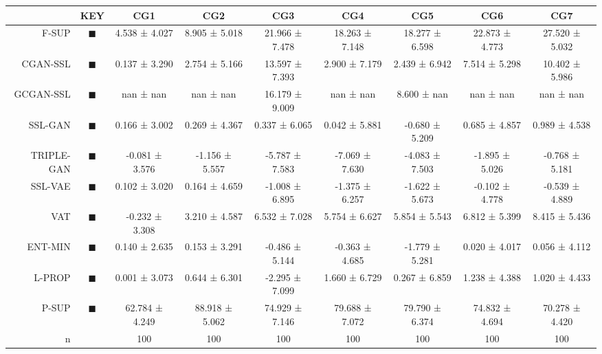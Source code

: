 \begin{tabular}{rcccccccc}
\toprule
 & KEY & CG1 & CG2 & CG3 & CG4 & CG5 & CG6 & CG7 \\
\midrule
F-SUP & \textcolor{FULLY_SUPERVISED_CLASSIFIER}{\LARGE $\blacksquare$} & 4.538 ± 4.027 & 8.905 ± 5.018 & 21.966 ± 7.478 & 18.263 ± 7.148 & 18.277 ± 6.598 & 22.873 ± 4.773 & 27.520 ± 5.032 \\
CGAN-SSL & \textcolor{CGAN_BASIC_DJ_SUPERVISED_CLASSIFIER}{\LARGE $\blacksquare$} & 0.137 ± 3.290 & 2.754 ± 5.166 & 13.597 ± 7.393 & 2.900 ± 7.179 & 2.439 ± 6.942 & 7.514 ± 5.298 & 10.402 ± 5.986 \\
GCGAN-SSL & \textcolor{CGAN_GUMBEL_DJ_SUPERVISED_CLASSIFIER}{\LARGE $\blacksquare$} & nan ± nan & nan ± nan & 16.179 ± 9.009 & nan ± nan & 8.600 ± nan & nan ± nan & nan ± nan \\
SSL-GAN & \textcolor{SSL_GAN}{\LARGE $\blacksquare$} & 0.166 ± 3.002 & 0.269 ± 4.367 & 0.337 ± 6.065 & 0.042 ± 5.881 & -0.680 ± 5.209 & 0.685 ± 4.857 & 0.989 ± 4.538 \\
TRIPLE-GAN & \textcolor{TRIPLE_GAN}{\LARGE $\blacksquare$} & -0.081 ± 3.576 & -1.156 ± 5.557 & -5.787 ± 7.583 & -7.069 ± 7.630 & -4.083 ± 7.503 & -1.895 ± 5.026 & -0.768 ± 5.181 \\
SSL-VAE & \textcolor{SSL_VAE}{\LARGE $\blacksquare$} & 0.102 ± 3.020 & 0.164 ± 4.659 & -1.008 ± 6.895 & -1.375 ± 6.257 & -1.622 ± 5.673 & -0.102 ± 4.778 & -0.539 ± 4.889 \\
VAT & \textcolor{VAT}{\LARGE $\blacksquare$} & -0.232 ± 3.308 & 3.210 ± 4.587 & 6.532 ± 7.028 & 5.754 ± 6.627 & 5.854 ± 5.543 & 6.812 ± 5.399 & 8.415 ± 5.436 \\
ENT-MIN & \textcolor{ENTROPY_MINIMISATION}{\LARGE $\blacksquare$} & 0.140 ± 2.635 & 0.153 ± 3.291 & -0.486 ± 5.144 & -0.363 ± 4.685 & -1.779 ± 5.281 & 0.020 ± 4.017 & 0.056 ± 4.112 \\
L-PROP & \textcolor{LABEL_PROPAGATION}{\LARGE $\blacksquare$} & 0.001 ± 3.073 & 0.644 ± 6.301 & -2.295 ± 7.099 & 1.660 ± 6.729 & 0.267 ± 6.859 & 1.238 ± 4.388 & 1.020 ± 4.433 \\
P-SUP & \textcolor{PARTIAL_SUPERVISED_CLASSIFIER}{\LARGE $\blacksquare$} & 62.784 ± 4.249 & 88.918 ± 5.062 & 74.929 ± 7.146 & 79.688 ± 7.072 & 79.790 ± 6.374 & 74.832 ± 4.694 & 70.278 ± 4.420 \\
n &  & 100 & 100 & 100 & 100 & 100 & 100 & 100 \\
\bottomrule
\end{tabular}
